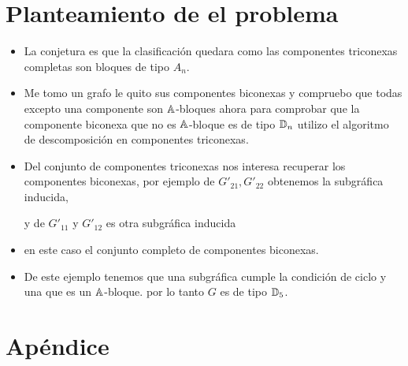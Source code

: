\documentclass[spanish]{beamer}
\begin{document}
\section{Planteamiento de el problema}
\begin{frame}{}
	\begin{itemize}
	\item La conjetura es que la clasificación quedara como las componentes triconexas completas son bloques de tipo $A_{n}$.
	\item Me tomo un grafo le quito sus componentes biconexas y compruebo que todas excepto una componente son $\mathbb{A}$-bloques ahora para comprobar que la componente biconexa que no es $\mathbb{A}$-bloque es de tipo $\mathbb{D}_{n}$ utilizo el algoritmo de descomposición en componentes triconexas.
	\end{itemize}
\end{frame}

\begin{frame}{}
	\begin{itemize}
	\item Del conjunto de componentes triconexas nos interesa recuperar los componentes biconexas, por ejemplo de $G'_{21}, G'_{22}$ obtenemos la subgráfica inducida,   y de $G'_{11}$ y $G'_{12}$ es otra subgráfica inducida 
  \item en este caso el conjunto completo de componentes biconexas.
  \item De este ejemplo tenemos que una subgráfica cumple la condición de ciclo y una que es un $\mathbb{A}$-bloque. por lo tanto $G$ es de tipo $\mathbb{D}_{5}$.
	\end{itemize}
\end{frame}

\appendix

\section*{Apéndice}
\end{document}
